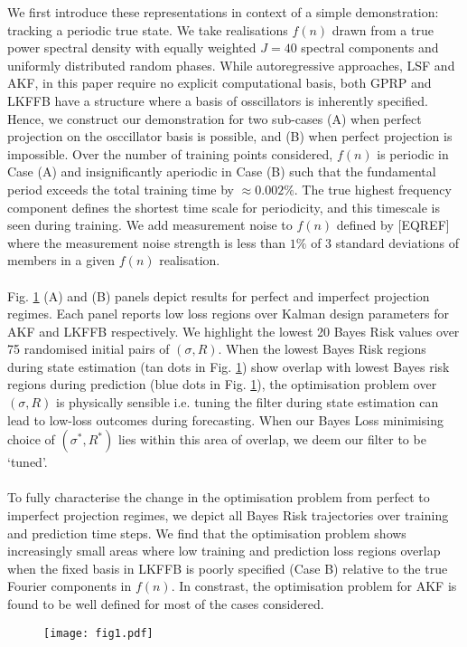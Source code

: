 We first introduce these representations in context of a simple demonstration: tracking a periodic true state. We take realisations $f(n)$ drawn from a true power spectral density with equally weighted $J=40$ spectral components and uniformly distributed random phases. While autoregressive approaches, LSF and AKF, in this paper require no explicit computational basis, both GPRP and LKFFB have a structure where a basis of osscillators is inherently specified. Hence, we construct our demonstration for two sub-cases (A) when perfect projection on the osccillator basis is possible, and (B) when perfect projection is impossible. Over the number of training points considered, $f(n)$ is periodic in Case (A) and insignificantly aperiodic in Case (B) such that the fundamental period exceeds the total training time by $\approx 0.002\%$. The true highest frequency component defines the shortest time scale for periodicity, and this timescale is seen during training. We add measurement noise to $f(n)$ defined by [EQREF] where the measurement noise strength is less than $1\%$ of 3 standard deviations of members in a given $f(n)$ realisation. 
\\
\\
Fig. \ref{fig:sec:main_fig1} (A) and (B) panels depict results for perfect and imperfect projection regimes. Each panel reports low loss regions over Kalman design parameters for AKF and LKFFB respectively. We highlight the lowest 20 Bayes Risk values over 75 randomised initial pairs of $(\sigma, R)$. When the lowest Bayes Risk regions during state estimation (tan dots in Fig. \ref{fig:sec:main_fig1}) show overlap with lowest Bayes risk regions during prediction (blue dots in Fig. \ref{fig:sec:main_fig1}), the optimisation problem over $(\sigma, R)$ is physically sensible i.e. tuning the filter during state estimation can lead to low-loss outcomes during forecasting. When our Bayes Loss minimising choice of $(\sigma^*, R^*)$ lies within this area of overlap, we deem our filter to be `tuned'. 
\\
\\
To fully characterise the change in the optimisation problem from perfect to imperfect projection regimes, we depict all Bayes Risk trajectories over training and prediction time steps. We find that the optimisation problem shows increasingly small areas where low training and prediction loss regions overlap when the fixed basis in LKFFB is poorly specified (Case B) relative to the true Fourier components in $f(n)$.  In constrast, the optimisation problem for AKF is found to be well defined for most of the cases considered.
 \begin{figure}[h!]
	\centering
	\caption{} \label{fig:sec:main_fig1}
	\texttt{[image: fig1.pdf]}
\end{figure}  

